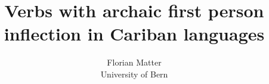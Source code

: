 \newcommand{\kaxone}{\\\small\begin{tabular}{@{}rllll@{}}
& \gl{a} & \gl{s_a_} & \gl{s_p_} & \gl{p}\\
\gl{1} & \obj{w-} & \obj{w-} & \obj{k-}, Ø/\obj{j-} & Ø/\obj{j-}\\
\gl{2} & \obj{m-} & \obj{m-} & \obj{o-} & \obj{o-}\\
\gl{1+2} & \obj{kɨt-} & \obj{kɨt-} & \obj{k-}, \obj{kɨt-} & \obj{k-}\\
\end{tabular}}

\newcommand{\pwone}{\\\small\begin{tabular}{@{}rllll@{}}
& \gl{a} & \gl{s_a_} & \gl{s_p_} & \gl{p}\\
\gl{1} & \rc{w-} & \emp{\rc{k-}} & \rc{k-} & \emp{\rc{owɨ(ro) j-}}\\
\gl{2} & \rc{m-} & \rc{m-} & \rc{o(j)-} & \rc{o(j)-}\\
\gl{1+2} & \rc{tɨt-} & \rc{tɨt-} & \rc{tɨt-} & \rc{k-}\\
\end{tabular}}

\newcommand{\hixone}{\\\small\begin{tabular}{@{}rllll@{}}
& \gl{a} & \gl{s_a_} & \gl{s_p_} & \gl{p}\\
\gl{1} & \obj{w-}/\obj{ɨ-} & \obj{k-} & \obj{k-} & \obj{r(o)-}\\
\gl{2} & \obj{m-} & \obj{m-} & \obj{o(j)-} & \obj{o(j)-}\\
\gl{1+2} & \obj{t-} & \obj{t-} & \obj{t-} & \obj{k-}\\
\end{tabular}}

\newcommand{\waione}{\\\small\begin{tabular}{@{}rllll@{}}
& \gl{a} & \gl{s_a_} & \gl{s_p_} & \gl{p}\\
\gl{1} & \obj{w-} & \obj{k-} & \obj{k-} & \obj{o(j)-}\\
\gl{2} & \obj{m-} & \obj{m-} & \emp{\obj{m-}} & \obj{a(w)-}\\
\gl{1+2} & \obj{t(ɨt)-} & \obj{t(ɨt)-} & \obj{t(ɨt)-} & \obj{k-}\\
\end{tabular}}

\title{Verbs with archaic first person inflection in Cariban languages}
\author{Florian Matter \\ University of Bern}


